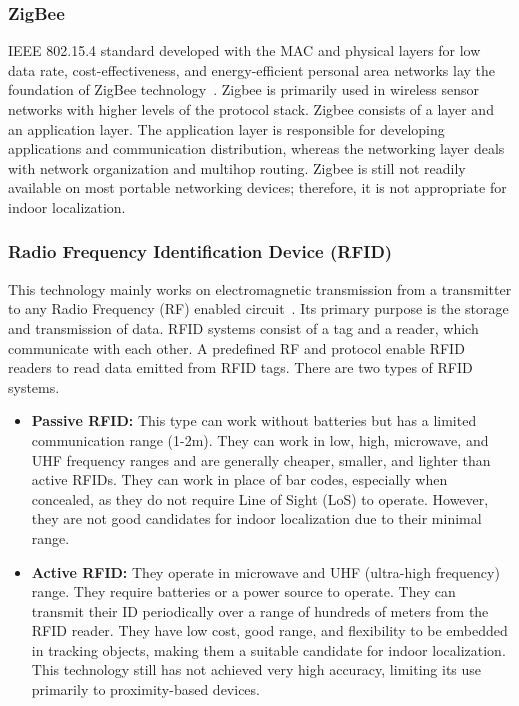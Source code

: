 \documentclass[a4paper,singleside,12pt]{report} %
\begin{document}
				\subsubsection{ZigBee}

					IEEE 802.15.4 standard developed with the MAC and physical layers for low data rate, cost-effectiveness, and energy-efficient personal area networks lay the foundation of ZigBee technology~\cite{baronti2007wireless}. 
					Zigbee is primarily used in wireless sensor networks with higher levels of the protocol stack. Zigbee consists of a layer and an application layer. 
					The application layer is responsible for developing applications and communication distribution, whereas the networking layer deals with network organization and multihop routing. 
					Zigbee is still not readily available on most portable networking devices; therefore, it is not appropriate for indoor localization.

				\subsubsection{Radio Frequency Identification Device (RFID)}

					This technology mainly works on electromagnetic transmission from a transmitter to any Radio Frequency (RF) enabled circuit~\cite{holm2009hybrid}. 
					Its primary purpose is the storage and transmission of data. RFID systems consist of a tag and a reader, which communicate with each other. 
					A predefined RF and protocol enable RFID readers to read data emitted from RFID tags. There are two types of RFID systems.
					
					\begin{itemize}
					
					\item  \textbf{Passive RFID:} This type can work without batteries but has a limited communication range (1-2m). They can work in low, high, microwave, and UHF frequency ranges and are generally cheaper, smaller, and lighter than active RFIDs. They can work in place of bar codes, especially when concealed, as they do not require Line of Sight (LoS) to operate. However, they are not good candidates for indoor localization due to their minimal range.
					\item  \textbf{Active RFID:} They operate in microwave and UHF (ultra-high frequency) range. They require batteries or a power source to operate. They can transmit their ID periodically over a range of hundreds of meters from the RFID reader. They have low cost, good range, and flexibility to be embedded in tracking objects, making them a suitable candidate for indoor localization. This technology still has not achieved very high accuracy, limiting its use primarily to proximity-based devices. 
					
					\end{itemize}
\end{document}
